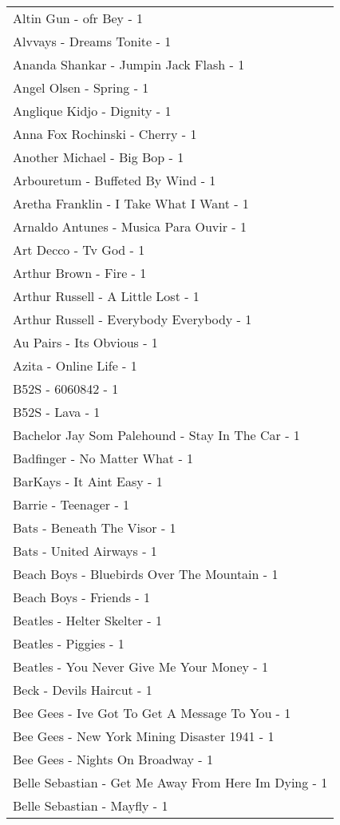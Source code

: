 \documentclass[
]{article}
\begin{document}
\begin{longtable}{l}
Altin Gun - ofr Bey - 1 \\ 
Alvvays - Dreams Tonite - 1 \\ 
Ananda Shankar - Jumpin Jack Flash - 1 \\ 
Angel Olsen - Spring - 1 \\ 
Anglique Kidjo - Dignity - 1 \\ 
Anna Fox Rochinski - Cherry - 1 \\ 
Another Michael - Big Bop - 1 \\ 
Arbouretum - Buffeted By Wind - 1 \\ 
Aretha Franklin - I Take What I Want - 1 \\ 
Arnaldo Antunes - Musica Para Ouvir - 1 \\ 
Art Decco - Tv God - 1 \\ 
Arthur Brown - Fire - 1 \\ 
Arthur Russell - A Little Lost - 1 \\ 
Arthur Russell - Everybody Everybody - 1 \\ 
Au Pairs - Its Obvious - 1 \\ 
Azita - Online Life - 1 \\ 
B52S - 6060842 - 1 \\ 
B52S - Lava - 1 \\ 
Bachelor Jay Som Palehound - Stay In The Car - 1 \\ 
Badfinger - No Matter What - 1 \\ 
BarKays - It Aint Easy - 1 \\ 
Barrie - Teenager - 1 \\ 
Bats - Beneath The Visor - 1 \\ 
Bats - United Airways - 1 \\ 
Beach Boys - Bluebirds Over The Mountain - 1 \\ 
Beach Boys - Friends - 1 \\ 
Beatles - Helter Skelter - 1 \\ 
Beatles - Piggies - 1 \\ 
Beatles - You Never Give Me Your Money - 1 \\ 
Beck - Devils Haircut - 1 \\ 
Bee Gees - Ive Got To Get A Message To You - 1 \\ 
Bee Gees - New York Mining Disaster 1941 - 1 \\ 
Bee Gees - Nights On Broadway - 1 \\ 
Belle Sebastian - Get Me Away From Here Im Dying - 1 \\ 
Belle Sebastian - Mayfly - 1 \\ 

\end{longtable}
\end{document}
